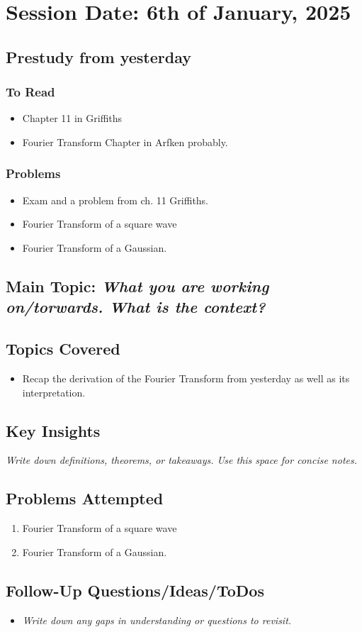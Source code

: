\section{Session Date: 6th of January, 2025}
\subsection*{Prestudy from yesterday}
\subsubsection*{To Read}
\begin{itemize}
    \item Chapter 11 in Griffiths
    \item Fourier Transform Chapter in Arfken probably. 
\end{itemize}
\subsubsection*{Problems}
\begin{itemize}
    \item Exam and a problem from ch. 11 Griffiths.
    \item Fourier Transform of a square wave
    \item Fourier Transform of a Gaussian.
\end{itemize}

\subsection*{Main Topic: \textit{What you are working on/torwards. What is the context?}}
\subsection*{Topics Covered}
\begin{itemize}
    \item Recap the derivation of the Fourier Transform from yesterday as well as its interpretation. 
\end{itemize}

\subsection*{Key Insights}
\textit{Write down definitions, theorems, or takeaways. Use this space for concise notes.}

\subsection*{Problems Attempted}
\begin{enumerate}
    \item Fourier Transform of a square wave
    \item Fourier Transform of a Gaussian.
\end{enumerate}

\subsection*{Follow-Up Questions/Ideas/ToDos}
\begin{itemize}
    \item \textit{Write down any gaps in understanding or questions to revisit.}
\end{itemize}
